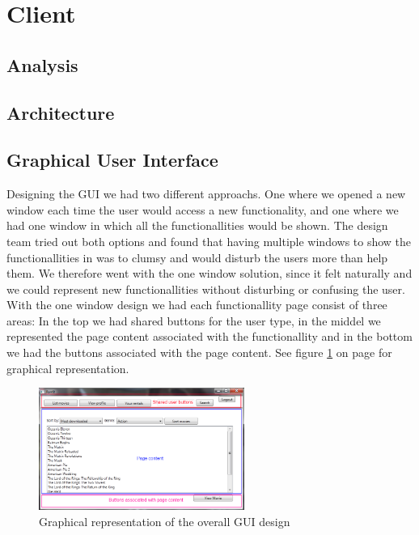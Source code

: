 \section{Client}
\label{Design_Client}

\subsection{Analysis}
\label{Design_Client_Analysis}

\subsection{Architecture}
\label{Design_Client_Architecture}

\subsection{Graphical User Interface}
\label{Design_Client_GUI}
Designing the GUI we had two different approachs. One where we opened a new window each time the user would access a new functionality, and one where we had one window in which all the functionallities would be shown. The design team tried out both options and found that having multiple windows to show the functionallities in was to clumsy and would disturb the users more than help them. We therefore went with the one window solution,  since it felt naturally and we could represent new functionallities without disturbing or confusing the user. With the one window design we had each functionallity page consist of three areas: In the top we had shared buttons for the user type, in the middel we represented the page content associated with the functionallity and in the bottom we had the buttons associated with the page content. See figure \ref{fig:Design_Client_GUI_Usability_design} on page \pageref{fig:Design_Client_GUI_Usability_design} for graphical representation.

\begin{figure}[h!]
  \centering
\includegraphics[width=0.60\textwidth]{Parts/Images/Design/GUIDesign}
\caption{Graphical representation of the overall GUI design}
\label{fig:Design_Client_GUI_Usability_design}
\end{figure}


